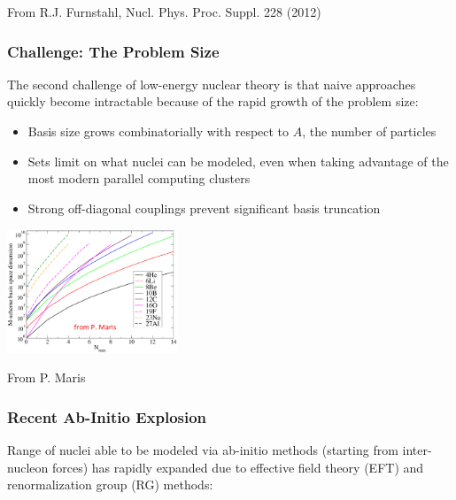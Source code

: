 \documentclass{beamer}
\begin{document}
{\begin{frame}
\begin{center}
\tiny From R.J. Furnstahl, Nucl. Phys. Proc. Suppl. 228 (2012)
\end{center}
\end{frame}

\begin{frame}
\frametitle{Challenge: The Problem Size}
The second challenge of low-energy nuclear theory is that naive approaches quickly become intractable because of the rapid growth of the problem size:
\begin{itemize}
    \item Basis size grows combinatorially with respect to $A$, the number of particles
    \item Sets limit on what nuclei can be modeled, even when taking advantage of the most modern parallel computing clusters
    \item Strong off-diagonal couplings prevent significant basis truncation
\end{itemize}
\begin{center}
\includegraphics[width=0.38\textwidth]{maris_m-scheme_dimension_ack}

\tiny From P. Maris
\end{center}
\end{frame}

\begin{frame}
\frametitle{Recent Ab-Initio Explosion}
Range of nuclei able to be modeled via ab-initio methods (starting from inter-nucleon forces) has rapidly expanded due to effective field theory (EFT) and renormalization group (RG) methods:


\end{frame}}
\end{document}

